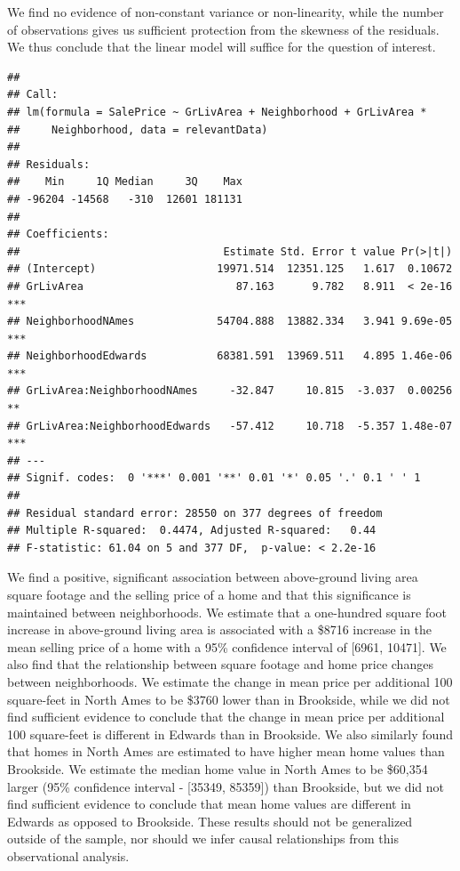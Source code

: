 \documentclass[american,]{article}
\begin{document}
We find no evidence of non-constant variance or non-linearity, while the
number of observations gives us sufficient protection from the skewness
of the residuals. We thus conclude that the linear model will suffice
for the question of interest.

\begin{verbatim}
## 
## Call:
## lm(formula = SalePrice ~ GrLivArea + Neighborhood + GrLivArea * 
##     Neighborhood, data = relevantData)
## 
## Residuals:
##    Min     1Q Median     3Q    Max 
## -96204 -14568   -310  12601 181131 
## 
## Coefficients:
##                                Estimate Std. Error t value Pr(>|t|)    
## (Intercept)                   19971.514  12351.125   1.617  0.10672    
## GrLivArea                        87.163      9.782   8.911  < 2e-16 ***
## NeighborhoodNAmes             54704.888  13882.334   3.941 9.69e-05 ***
## NeighborhoodEdwards           68381.591  13969.511   4.895 1.46e-06 ***
## GrLivArea:NeighborhoodNAmes     -32.847     10.815  -3.037  0.00256 ** 
## GrLivArea:NeighborhoodEdwards   -57.412     10.718  -5.357 1.48e-07 ***
## ---
## Signif. codes:  0 '***' 0.001 '**' 0.01 '*' 0.05 '.' 0.1 ' ' 1
## 
## Residual standard error: 28550 on 377 degrees of freedom
## Multiple R-squared:  0.4474, Adjusted R-squared:   0.44 
## F-statistic: 61.04 on 5 and 377 DF,  p-value: < 2.2e-16
\end{verbatim}

We find a positive, significant association between above-ground living
area square footage and the selling price of a home and that this
significance is maintained between neighborhoods. We estimate that a
one-hundred square foot increase in above-ground living area is
associated with a \$8716 increase in the mean selling price of a home
with a 95\% confidence interval of {[}6961, 10471{]}. We also find that
the relationship between square footage and home price changes between
neighborhoods. We estimate the change in mean price per additional 100
square-feet in North Ames to be \$3760 lower than in Brookside, while we
did not find sufficient evidence to conclude that the change in mean
price per additional 100 square-feet is different in Edwards than in
Brookside. We also similarly found that homes in North Ames are
estimated to have higher mean home values than Brookside. We estimate
the median home value in North Ames to be \$60,354 larger (95\%
confidence interval - {[}35349, 85359{]}) than Brookside, but we did not
find sufficient evidence to conclude that mean home values are different
in Edwards as opposed to Brookside. These results should not be
generalized outside of the sample, nor should we infer causal
relationships from this observational analysis.
\end{document}
